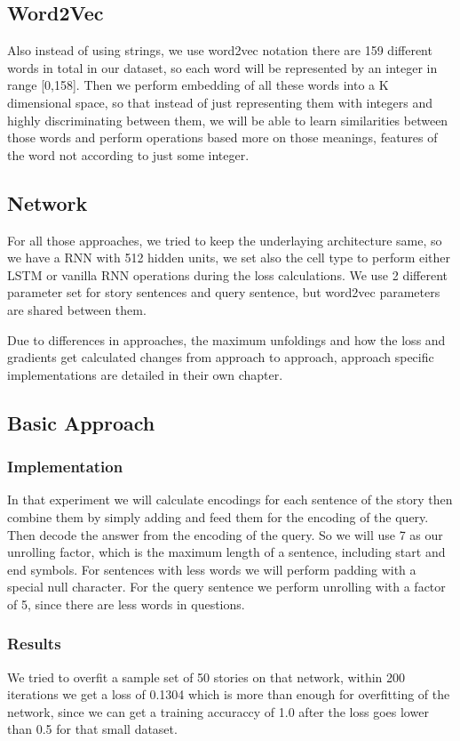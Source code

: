 \documentclass[conference,compsoc]{IEEEtran}
\begin{document}
\subsection{Word2Vec}
Also instead of using strings, we use word2vec notation there are 159 different
words in total in our dataset, so each word will be represented by an integer in
range [0,158]. Then we perform embedding of all these words into a K dimensional
space, so that instead of just representing them with integers and highly 
discriminating between them, we will be able to learn similarities between those
words and perform operations based more on those meanings, features of the word not
according to just some integer.

\subsection{Network}
For all those approaches, we tried to keep the underlaying architecture same, so
we have a RNN with 512 hidden units, we set also the cell type to perform either
LSTM or vanilla RNN operations during the loss calculations. We use 2 different
parameter set for story sentences and query sentence, but word2vec parameters
are shared between them.

Due to differences in approaches, the maximum unfoldings and how the loss and
gradients get calculated changes from approach to approach, approach specific
implementations are detailed in their own chapter.

\subsection{Basic Approach}
\subsubsection{Implementation}
In that experiment we will calculate encodings for each sentence of the story
then combine them by simply adding and feed them for the encoding of the query.
Then decode the answer from the encoding of the query. So we will use 7 as our
unrolling factor, which is the maximum length of a sentence, including start
and end symbols. For sentences with less words we will perform padding with a
special null character. For the query sentence we perform unrolling with a factor
of 5, since there are less words in questions.

\subsubsection{Results}
We tried to overfit a sample set of 50 stories on that network, within 200 iterations
we get a loss of 0.1304 which is more than enough for overfitting of the network, since
we can get a training accuraccy of 1.0 after the loss goes lower than 0.5 for that small
dataset.
\end{document}
